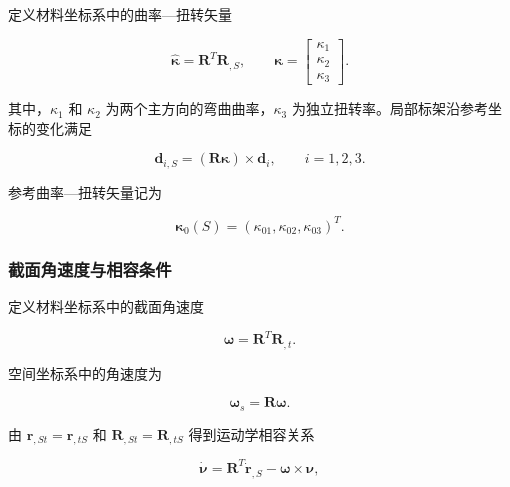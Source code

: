定义材料坐标系中的曲率---扭转矢量

\begin{equation}
\label{eq:rod-1-13}
\widehat{\bm{\kappa}} = \mathbf{R}^{T}\mathbf{R}_{,S},\quad\quad\bm{\kappa} = \begin{bmatrix}
\kappa_{1} \\
\kappa_{2} \\
\kappa_{3}
\end{bmatrix}.
\end{equation}

其中，\(\kappa_{1}\) 和 \(\kappa_{2}\) 为两个主方向的弯曲曲率，\(\kappa_{3}\) 为独立扭转率。局部标架沿参考坐标的变化满足

\begin{equation}
\label{eq:rod-1-14}
\mathbf{d}_{i,S} = \left( \mathbf{R}\bm{\kappa} \right) \times \mathbf{d}_{i},\quad\quad i = 1,2,3.
\end{equation}

参考曲率---扭转矢量记为

\begin{equation}
\label{eq:rod-1-15}
\bm{\kappa}_{0}(S) = \left( \kappa_{01},\kappa_{02},\kappa_{03} \right)^{T}.
\end{equation}

\subsubsection{截面角速度与相容条件}\label{sec:rod-1-2-5}

定义材料坐标系中的截面角速度

\begin{equation}
\label{eq:rod-1-16}
\widehat{\bm{\omega}} = \mathbf{R}^{T}\mathbf{R}_{,t}.
\end{equation}

空间坐标系中的角速度为

\begin{equation}
\label{eq:rod-1-17}
\bm{\omega}_{s} = \mathbf{R}\bm{\omega}.
\end{equation}

由 \(\mathbf{r}_{,St} = \mathbf{r}_{,tS}\) 和 \(\mathbf{R}_{,St} = \mathbf{R}_{,tS}\) 得到运动学相容关系\cite{Simo1985FiniteStrainBeam,Antman2005Elasticity,Sola2018MicroLie}

\begin{equation}
\label{eq:rod-1-18}
\dot{\bm{\nu}} = \mathbf{R}^{T}{\dot{\mathbf{r}}}_{,S} - \bm{\omega} \times \bm{\nu},
\end{equation}


